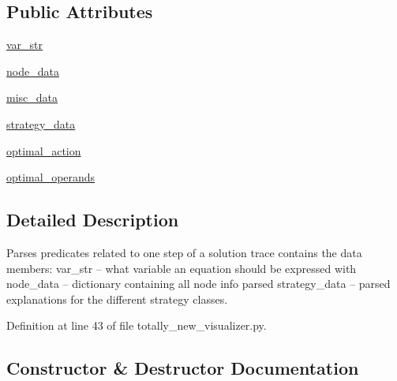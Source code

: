 \subsection*{Public Attributes}
\begin{DoxyCompactItemize}
\item 
\hyperlink{classtotally__new__visualizer_1_1_equation_step_parser_a021358bd55a4cea135012d4a83138711}{var\+\_\+str}
\item 
\hyperlink{classtotally__new__visualizer_1_1_equation_step_parser_ad7bb7147eedff025bb568ecb8826ce08}{node\+\_\+data}
\item 
\hyperlink{classtotally__new__visualizer_1_1_equation_step_parser_a9fd629de7e40b3f7764fb91e9d1c7962}{misc\+\_\+data}
\item 
\hyperlink{classtotally__new__visualizer_1_1_equation_step_parser_ac5cad9ea5ae6ed0d1c86a506b0a0e76e}{strategy\+\_\+data}
\item 
\hyperlink{classtotally__new__visualizer_1_1_equation_step_parser_a1d2445c87a6b9d8400ef8c78ea2e5919}{optimal\+\_\+action}
\item 
\hyperlink{classtotally__new__visualizer_1_1_equation_step_parser_adcf8eb027974aa76205cbd1e42604919}{optimal\+\_\+operands}
\end{DoxyCompactItemize}


\subsection{Detailed Description}
Parses predicates related to one step of a solution trace contains the data members\+: var\+\_\+str -- what variable an equation should be expressed with node\+\_\+data -- dictionary containing all node info parsed strategy\+\_\+data -- parsed explanations for the different strategy classes. 

Definition at line 43 of file totally\+\_\+new\+\_\+visualizer.\+py.



\subsection{Constructor \& Destructor Documentation}
\hypertarget{classtotally__new__visualizer_1_1_equation_step_parser_a025ac2e5112841d4b340029c120412f2}{}
